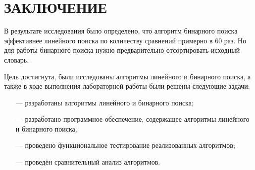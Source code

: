 \chapter*{\hfill{\centering \MakeUppercase{Заключение}}\hfill}

В результате исследования было определено, что алгоритм бинарного поиска эффективнее линейного поиска по количеству сравнений примерно в 60 раз. Но для работы бинарного поиска нужно предварительно отсортировать исходный словарь.

Цель достигнута, были исследованы алгоритмы линейного и бинарного поиска, а также в ходе выполнения лабораторной работы были решены следующие задачи:

\begin{itemize}
    \item[---] разработаны алгоритмы линейного и бинарного поиска;
    \item[---] разработано программное обеспечение, содержащее алгоритмы линейного и бинарного поиска;
    \item[---] проведено функциональное тестирование реализованных алгоритмов;
    \item[---] проведён сравнительный анализ алгоритмов.
\end{itemize}
